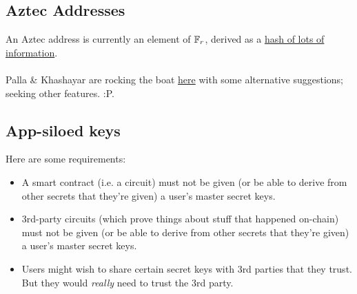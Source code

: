 \subsection{Aztec Addresses}

An Aztec address is currently an element of $\Fr$, derived as a \href{https://docs.aztec.network/protocol-specs/addresses-and-keys/address}{hash of lots of information}.\\
\\
Palla \& Khashayar are rocking the boat \href{https://hackmd.io/89n_KZJZQYKsFr0WqaYjDw}{here} with some alternative suggestions; seeking other features. :P.





\subsection{App-siloed keys}

Here are some requirements:
\begin{itemize}
    \item A smart contract (i.e. a circuit) must not be given (or be able to derive from other secrets that they're given) a user's master secret keys.
    \item 3rd-party circuits (which prove things about stuff that happened on-chain) must not be given (or be able to derive from other secrets that they're given) a user's master secret keys.
    \item Users might wish to share certain secret keys with 3rd parties that they trust. But they would \textit{really} need to trust the 3rd party.
\end{itemize}






